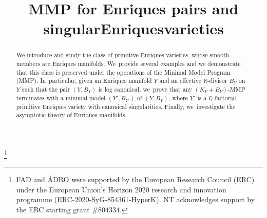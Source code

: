 \documentclass[JEP,XML,SOM,Unicode,published]{cedram}
\theoremstyle{plain}
\theoremstyle{definition}
\begin{document}
\frontmatter
\title[MMP for Enriques pairs and singular Enriques varieties]{MMP for Enriques pairs and singular\nobreakspace Enriques\nobreakspace varieties}

\author[\initial{F. A.} \lastname{Denisi}]{ }
\address{Fachrichtung Mathematik, Campus, Gebäude E2.4, Universität des Saarlandes,\\
66123 Saarbrücken, Germany}

\author[\initial{A. D.} \lastname{Ríos Ortiz}]{ }
\address{Université Paris-Saclay, CNRS, Laboratoire de Mathématiques d'Orsay,\\
Bât.\ 307, 91405 Orsay, France}
\urladdr{}

\author[\initial{N.} \lastname{Tsakanikas}]{ }
\address{Institut de Mathématiques (CAG), École Polytechnique Fédérale de Lausanne (EPFL),\\
1015 Lausanne, Switzerland}

\author[\initial{Z.} \lastname{Xie}]{ }
\address{Institut Élie Cartan de Lorraine, Université de Lorraine,\\
54506 Nancy, France}

\thanks{FAD and ÁDRO were supported by the European Research Council (ERC) under the European Union's Horizon 2020 research and innovation programme (ERC-2020-SyG-854361-HyperK). NT acknowledges support by the ERC starting grant $\#804334$.}


\begin{abstract}
We introduce and study the class of primitive Enriques varieties, whose smooth members are Enriques manifolds. We~provide several examples and we demonstrate that this class is preserved under the operations of the Minimal Model Program (MMP). In~particular, given an Enriques manifold $Y$ and an effective $\mathbb{R}$-divisor $B_Y$ on $Y$ such that the pair $(Y,B_Y)$ is log canonical, we~prove that any $(K_Y + B_Y)$-MMP terminates with a minimal model $(Y',B_{Y'})$ of $(Y,B_Y)$, where $Y'$ is a $\mathbb{Q}$-factorial primitive Enriques variety with canonical singularities. Finally, we~investigate the asymptotic theory of Enriques manifolds.
\end{abstract}
\end{document}
